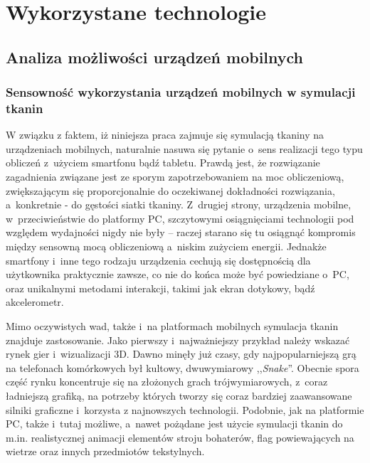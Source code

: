 \chapter{Wykorzystane technologie}
\label{t:technologie}


	\section{Analiza możliwości urządzeń mobilnych}
	\label{t:technologie:mobilne}
	
		\subsection{Sensowność wykorzystania urządzeń mobilnych w symulacji tkanin}
		\label{t:technologie:mobilne:dlaczego}
		
		
		W związku z faktem, iż niniejsza praca zajmuje się symulacją tkaniny na urządzeniach mobilnych, naturalnie nasuwa się pytanie o~sens realizacji tego typu obliczeń z~użyciem smartfonu bądź tabletu. Prawdą jest, że rozwiązanie zagadnienia związane jest ze sporym zapotrzebowaniem na moc obliczeniową, zwiększającym się proporcjonalnie do oczekiwanej dokładności rozwiązania, a~konkretnie - do gęstości siatki tkaniny. Z~drugiej strony, urządzenia mobilne, w~przeciwieństwie do platformy PC, szczytowymi osiągnięciami technologii pod względem wydajności nigdy nie były -- raczej starano się tu osiągnąć kompromis między sensowną mocą obliczeniową a~niskim zużyciem energii. Jednakże smartfony i~inne tego rodzaju urządzenia cechują się dostępnością dla użytkownika praktycznie zawsze, co nie do końca może być powiedziane o~PC, oraz unikalnymi metodami interakcji, takimi jak ekran dotykowy, bądź akcelerometr.
		
		Mimo oczywistych wad, także i~na platformach mobilnych symulacja tkanin znajduje zastosowanie. Jako pierwszy i~najważniejszy przykład należy wskazać rynek gier i~wizualizacji 3D. Dawno minęły już czasy, gdy najpopularniejszą grą na telefonach komórkowych był kultowy, dwuwymiarowy ,,\emph{Snake}''. Obecnie spora część rynku koncentruje się na złożonych grach trójwymiarowych, z~coraz ładniejszą grafiką, na potrzeby których tworzy się coraz bardziej zaawansowane silniki graficzne i~korzysta z najnowszych technologii. Podobnie, jak na platformie PC, także i~tutaj możliwe, a~nawet pożądane jest użycie symulacji tkanin do m.in. realistycznej animacji elementów stroju bohaterów, flag powiewających na wietrze oraz innych przedmiotów tekstylnych.
		

